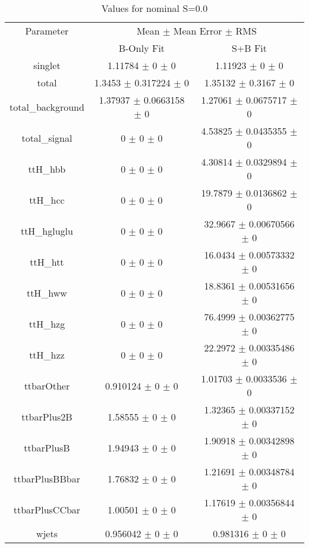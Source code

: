 \begin{table}
\centering
\caption{Values for nominal S=0.0}
\begin{tabular}{ccc}
\toprule
Parameter & \multicolumn{2}{c}{Mean $\pm$ Mean Error $\pm$ RMS}\\
 & B-Only Fit & S+B Fit\\
\midrule
singlet & \num{1.11784} $\pm$ \num{0} $\pm$ \num{0} & \num{1.11923} $\pm$ \num{0} $\pm$ \num{0}\\
total & \num{1.3453} $\pm$ \num{0.317224} $\pm$ \num{0} & \num{1.35132} $\pm$ \num{0.3167} $\pm$ \num{0}\\
total\_background & \num{1.37937} $\pm$ \num{0.0663158} $\pm$ \num{0} & \num{1.27061} $\pm$ \num{0.0675717} $\pm$ \num{0}\\
total\_signal & \num{0} $\pm$ \num{0} $\pm$ \num{0} & \num{4.53825} $\pm$ \num{0.0435355} $\pm$ \num{0}\\
ttH\_hbb & \num{0} $\pm$ \num{0} $\pm$ \num{0} & \num{4.30814} $\pm$ \num{0.0329894} $\pm$ \num{0}\\
ttH\_hcc & \num{0} $\pm$ \num{0} $\pm$ \num{0} & \num{19.7879} $\pm$ \num{0.0136862} $\pm$ \num{0}\\
ttH\_hgluglu & \num{0} $\pm$ \num{0} $\pm$ \num{0} & \num{32.9667} $\pm$ \num{0.00670566} $\pm$ \num{0}\\
ttH\_htt & \num{0} $\pm$ \num{0} $\pm$ \num{0} & \num{16.0434} $\pm$ \num{0.00573332} $\pm$ \num{0}\\
ttH\_hww & \num{0} $\pm$ \num{0} $\pm$ \num{0} & \num{18.8361} $\pm$ \num{0.00531656} $\pm$ \num{0}\\
ttH\_hzg & \num{0} $\pm$ \num{0} $\pm$ \num{0} & \num{76.4999} $\pm$ \num{0.00362775} $\pm$ \num{0}\\
ttH\_hzz & \num{0} $\pm$ \num{0} $\pm$ \num{0} & \num{22.2972} $\pm$ \num{0.00335486} $\pm$ \num{0}\\
ttbarOther & \num{0.910124} $\pm$ \num{0} $\pm$ \num{0} & \num{1.01703} $\pm$ \num{0.0033536} $\pm$ \num{0}\\
ttbarPlus2B & \num{1.58555} $\pm$ \num{0} $\pm$ \num{0} & \num{1.32365} $\pm$ \num{0.00337152} $\pm$ \num{0}\\
ttbarPlusB & \num{1.94943} $\pm$ \num{0} $\pm$ \num{0} & \num{1.90918} $\pm$ \num{0.00342898} $\pm$ \num{0}\\
ttbarPlusBBbar & \num{1.76832} $\pm$ \num{0} $\pm$ \num{0} & \num{1.21691} $\pm$ \num{0.00348784} $\pm$ \num{0}\\
ttbarPlusCCbar & \num{1.00501} $\pm$ \num{0} $\pm$ \num{0} & \num{1.17619} $\pm$ \num{0.00356844} $\pm$ \num{0}\\
wjets & \num{0.956042} $\pm$ \num{0} $\pm$ \num{0} & \num{0.981316} $\pm$ \num{0} $\pm$ \num{0}\\
\bottomrule
\end{tabular}
\end{table}